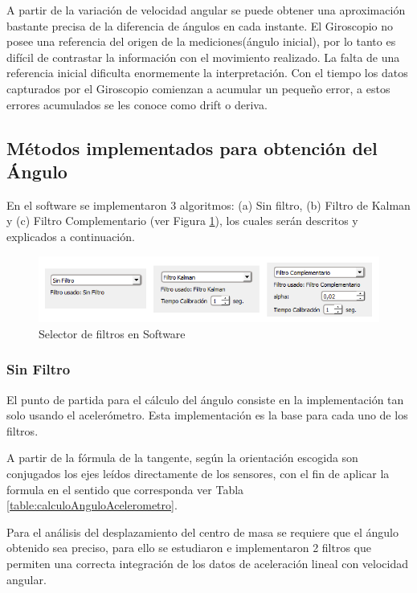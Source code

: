 \documentclass[12pt,a4paper]{article}
\begin{document}
A partir de la variación de velocidad angular se puede obtener una aproximación bastante precisa de la diferencia de ángulos en cada instante.
El Giroscopio no posee una referencia del origen de la mediciones(ángulo inicial), por lo tanto es difícil de contrastar la información con el movimiento realizado.
La falta de una referencia inicial dificulta enormemente la interpretación. Con el tiempo los datos capturados por el Giroscopio comienzan a acumular un pequeño error, a estos errores acumulados se les conoce como drift o deriva.

\subsection{Métodos implementados para obtención del Ángulo}
En el software se implementaron 3 algoritmos: (a) Sin filtro, (b) Filtro de Kalman y (c) Filtro Complementario (ver Figura \ref{fig:selectorFiltros}), los cuales serán descritos y explicados a continuación.
	
\begin{figure}[H]
\centering
	\includegraphics[scale=0.9]{images/implementacionFiltros}
	\caption{Selector de filtros en Software}
\label{fig:selectorFiltros}
\end{figure}

\subsubsection{Sin Filtro} El punto de partida para el cálculo del ángulo consiste en la implementación tan solo usando el acelerómetro. Esta implementación es la base para cada uno de los filtros.

A partir de la fórmula de la tangente, según la orientación escogida son conjugados los ejes leídos directamente de los sensores, con el fin de aplicar la formula en el sentido que corresponda ver Tabla \ref{table:calculoAnguloAcelerometro}.


Para el análisis del desplazamiento del centro de masa se requiere que el ángulo obtenido sea preciso, para ello se estudiaron e implementaron 2 filtros que permiten una correcta integración de los datos de aceleración lineal con velocidad angular.
\end{document}
